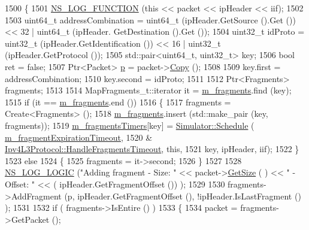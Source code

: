 \begin{DoxyCode}
1500 \{
1501   \hyperlink{log-macros-disabled_8h_a90b90d5bad1f39cb1b64923ea94c0761}{NS\_LOG\_FUNCTION} (\textcolor{keyword}{this} << packet << ipHeader << iif);
1502 
1503   uint64\_t addressCombination = uint64\_t (ipHeader.GetSource ().Get ()) << 32 | uint64\_t (ipHeader.
      GetDestination ().Get ());
1504   uint32\_t idProto = uint32\_t (ipHeader.GetIdentification ()) << 16 | uint32\_t (ipHeader.GetProtocol ());
1505   std::pair<uint64\_t, uint32\_t> key;
1506   \textcolor{keywordtype}{bool} ret = \textcolor{keyword}{false};
1507   Ptr<Packet> \hyperlink{lte__link__budget_8m_ac9de518908a968428863f829398a4e62}{p} = packet->\hyperlink{classns3_1_1Packet_a5d5c70802a5f77fc5f0001e0cfc1898b}{Copy} ();
1508 
1509   key.first = addressCombination;
1510   key.second = idProto;
1511 
1512   Ptr<Fragments> fragments;
1513 
1514   MapFragments\_t::iterator it = \hyperlink{classns3_1_1Ipv4L3Protocol_a0eb853df4608f63e9447d8a33d427ccf}{m\_fragments}.find (key);
1515   \textcolor{keywordflow}{if} (it == \hyperlink{classns3_1_1Ipv4L3Protocol_a0eb853df4608f63e9447d8a33d427ccf}{m\_fragments}.end ())
1516     \{
1517       fragments = Create<Fragments> ();
1518       \hyperlink{classns3_1_1Ipv4L3Protocol_a0eb853df4608f63e9447d8a33d427ccf}{m\_fragments}.insert (std::make\_pair (key, fragments));
1519       \hyperlink{classns3_1_1Ipv4L3Protocol_a3233e1de6e8f43299a353107adafbed2}{m\_fragmentsTimers}[key] = \hyperlink{classns3_1_1Simulator_a671882c894a08af4a5e91181bf1eec13}{Simulator::Schedule} (
      \hyperlink{classns3_1_1Ipv4L3Protocol_a6ad1c5e5d4bde4a903aadab94c6ec164}{m\_fragmentExpirationTimeout},
1520                                                     &
      \hyperlink{classns3_1_1Ipv4L3Protocol_a387d96062b7810153592f3a6f257de74}{Ipv4L3Protocol::HandleFragmentsTimeout}, \textcolor{keyword}{this},
1521                                                     key, ipHeader, iif);
1522     \}
1523   \textcolor{keywordflow}{else}
1524     \{
1525       fragments = it->second;
1526     \}
1527 
1528   \hyperlink{group__logging_ga88acd260151caf2db9c0fc84997f45ce}{NS\_LOG\_LOGIC} (\textcolor{stringliteral}{"Adding fragment - Size: "} << packet->\hyperlink{classns3_1_1Packet_a462855c9929954d4301a4edfe55f4f1c}{GetSize} ( ) << \textcolor{stringliteral}{" - Offset: "} << (
      ipHeader.GetFragmentOffset ()) );
1529 
1530   fragments->AddFragment (p, ipHeader.GetFragmentOffset (), !ipHeader.IsLastFragment () );
1531 
1532   \textcolor{keywordflow}{if} ( fragments->IsEntire () )
1533     \{
1534       packet = fragments->GetPacket ();

\end{DoxyCode}
